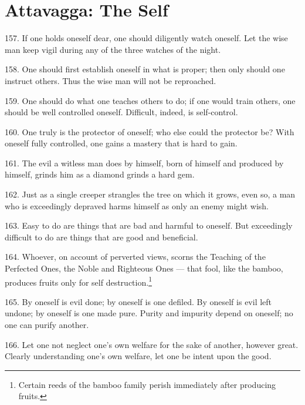 \newpage
\chapter{Attavagga: The Self}

157. If one holds oneself dear, one should diligently watch oneself. Let the wise man keep vigil during any of the three watches of the night.

158. One should first establish oneself in what is proper; then only should one instruct others. Thus the wise man will not be reproached.

159. One should do what one teaches others to do; if one would train others, one should be well controlled oneself. Difficult, indeed, is self-control.

160. One truly is the protector of oneself; who else could the protector be? With oneself fully controlled, one gains a mastery that is hard to gain.

161. The evil a witless man does by himself, born of himself and produced by himself, grinds him as a diamond grinds a hard gem.

162. Just as a single creeper strangles the tree on which it grows, even so, a man who is exceedingly depraved harms himself as only an enemy might wish.

163. Easy to do are things that are bad and harmful to oneself. But exceedingly difficult to do are things that are good and beneficial.

164. Whoever, on account of perverted views, scorns the Teaching of the Perfected Ones, the Noble and Righteous Ones — that fool, like the bamboo, produces fruits only for self destruction.\footnote{Certain reeds of the bamboo family perish immediately after producing fruits.}

165. By oneself is evil done; by oneself is one defiled. By oneself is evil left undone; by oneself is one made pure. Purity and impurity depend on oneself; no one can purify another.

166. Let one not neglect one's own welfare for the sake of another, however great. Clearly understanding one's own welfare, let one be intent upon the good.
